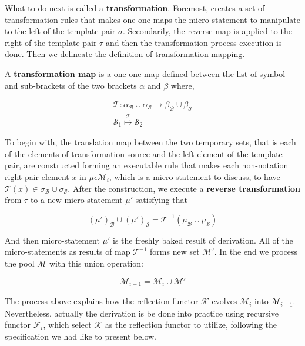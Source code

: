 \documentclass[preprint]{elsarticle}
\numberwithin{theorem}{section}	%
\numberwithin{axiom}{section}	%
\numberwithin{definition}{section}	%
\begin{document}
What to do next is called a \textbf{ transformation}. Foremost, creates a set of transformation rules that makes one-one maps the micro-statement to manipulate to the left of the template pair \(\sigma\). Secondarily, the reverse map is applied to the right of the template pair \(\tau\) and then the transformation process execution is done. Then we delineate the definition of { }transformation mapping.

\begin{definition}
	A \textbf{ transformation map} is a one-one map defined between the list of symbol and sub-brackets of the two brackets \(\alpha\) and \(\beta\) where,
	
	\begin{equation}
		\begin{gathered}
			\mathcal{T}:\alpha _{\mathcal{B}}\cup \alpha _{\mathcal{S}}\to \beta _{\mathcal{B}}\cup \beta _{\mathcal{S}}\\
			\mathcal{S}_1\overset{\mathcal{T}}{\mapsto }\mathcal{S}_2
		\end{gathered}
	\end{equation}
	
	To begin with, the translation map between the two temporary sets, that is each of the elements of transformation source and the left element of the template pair, are constructed forming an executable rule that makes each non-notation right pair element \(x\) in \(\mu \epsilon \mathcal{M}_i\), which is a micro-statement to discuss, to have \(\mathcal{T}(x)\in \sigma _{\mathcal{B}}\cup \sigma _{\mathcal{S}}\). After the construction, we execute a \textbf{ reverse transformation } from \(\tau\) to a new micro-statement \(\mu '\) satisfying that
	
	\begin{equation}
		(\mu ')_{\mathcal{B}}\cup (\mu ')_{\mathcal{S}} =\mathcal{T}^{-1}\left(\mu _{\mathcal{B}}\cup \mu _{\mathcal{S}}\right)
	\end{equation}
	
	And then micro-statement \(\mu '\) is the freshly baked result of derivation. All of the micro-statements as results of map \(\mathcal{T}^{-1}\) forms new set \(\mathcal{M}'\). In the end we process the pool \(\mathcal{M}\) with this union operation:
	
	\[\mathcal{M}_{i+1}=\mathcal{M}_i\cup \mathcal{M}'\]
\end{definition}

The process above explains how the reflection functor \(\mathcal{K}\) evolves \(\mathcal{M}_i\) into \(\mathcal{M}_{i+1}\). Nevertheless, actually the derivation is be done into practice using recursive functor \(\mathcal{F}_i\), which select \(\mathcal{K}\) as the reflection functor to utilize, following the specification we had like to present below.
\end{document}
